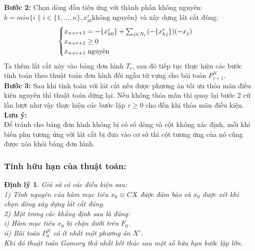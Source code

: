 \documentclass[12pt,a4paper]{report}
\newtheorem{dl}{Định lý}
\begin{document}
\textbf{Bước 2:}
Chọn dòng đầu tiên ứng với thành phần không nguyên:\\
$k=min\{i\|i\in \{1,...,n\},x_{i0}^r \text{không nguyên}\}$ và xây dựng lát cắt đúng:\\
$$   \begin{cases}\label{latcat}
    x_{n+r+1}= -\{x_{k0}^r\} + \sum_{j\in N_r}(-\{x_{kj}^r\} )(-x_j)\\
    x_{n+r+1} \ge 0\\
    x_{n+r+1} \hspace{0.1cm} \text{nguyên}
\end{cases}$$
Ta thêm lắt cắt này vào bảng đơn hình $T_r$, sau đó tiếp tục thực hiện các bước tính toán theo thuật toán đơn hình đối ngẫu từ vựng cho bài toán $P^N_{r+1}$.\\

\textbf{Bước 3:}
Sau khi tính toán với lát cắt nếu được phương án tối ưu thỏa mãn điều kiện nguyên thì thuật toán dừng lại. Nếu không thỏa mãn thì quay lại bước 2 cứ lần lượt như vậy thực hiện các bước lặp $r \ge 0$ cho đến khi thỏa mãn điều kiện.
\textbf{Lưu ý:}\\
Để tránh cho bảng đơn hình không bị có số dòng và cột không xác định, mỗi khi biến phụ tương ứng với lát cắt bị đưa vào cơ sở thì cột tương ứng của nó cũng được xóa khỏi bảng đơn hình.
\subsubsection{Tính hữu hạn của thuật toán:}
\begin{dl}
Giả sử có các điều kiện sau:\\
1) Tính nguyên của hàm mục tiêu $x_0\equiv CX$ được đảm bảo và $x_0$ được xét khi chọn dòng xây dựng lát cắt đúng.\\
2) Một trong các khẳng định sau là đúng:\\
i) Hàm mục tiêu $x_0$ bị chặn dưới trên $F_0$.\\ 
ii) Bài toán $P^N_0$ có ít nhất một phương án $X'$.\\
 Khi đó thuật toán Gomory thứ nhất kết thúc sau một số hữu hạn bước lặp lớn.
 \end{dl}
 
\end{document}
